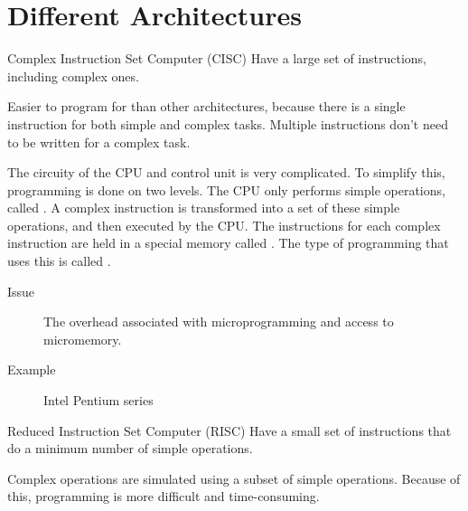 \documentclass[../notes.tex]{subfiles}
\begin{document}
			\section{Different Architectures}
				\begin{definition}{Complex Instruction Set Computer (CISC)}
					Have a large set of instructions, including complex ones.

					Easier to program for than other architectures, because there is a single instruction for both simple and complex tasks. Multiple instructions don't need to be written for a complex task.

					The circuity of the CPU and control unit is very complicated. To simplify this, programming is done on two levels. The CPU only performs simple operations, called . A complex instruction is transformed into a set of these simple operations, and then executed by the CPU. The instructions for each complex instruction are held in a special memory called . The type of programming that uses this is called .

					\begin{description}
						\item[Issue] The overhead associated with microprogramming and access to micromemory.
						\item[Example] Intel Pentium series
					\end{description}
				\end{definition}
				\begin{definition}{Reduced Instruction Set Computer (RISC)}
					Have a small set of instructions that do a minimum number of simple operations.

					Complex operations are simulated using a subset of simple operations. Because of this, programming is more difficult and time-consuming.
				\end{definition}

\end{document}
